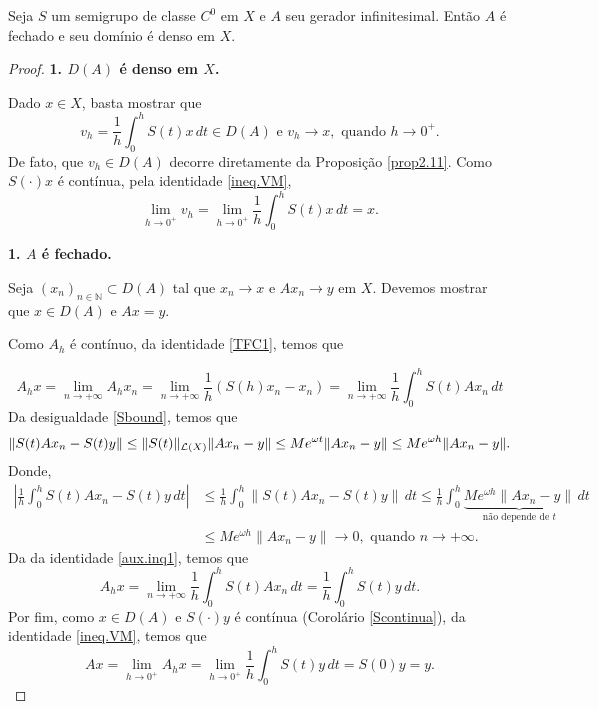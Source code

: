 \begin{proposition}
Seja $S$ um semigrupo de classe $C^0$ em $X$ e $A$ seu gerador infinitesimal. Então $A$ é fechado e seu domínio é denso em $X$.
\end{proposition}
\begin{proof}
\noindent

\noindent\textbf{1. $D(A)$ é denso em $X$.}

Dado $x\in X$, basta mostrar que 
\[v_h=\frac{1}{h}\int_0^h S(t)x\,dt\in D(A) \text{ e } v_h\to x, \text{ quando } h\to 0^+.\]
De fato, que $v_h\in D(A)$ decorre diretamente da Proposição \ref{prop2.11}. Como $S(\cdot)x$ é contínua, pela identidade \eqref{ineq.VM}, 
\[\lim\limits_{h\to 0^+} v_h=\lim\limits_{h\to 0^+}\frac{1}{h}\int_0^h S(t)x\,dt=x.\]

\noindent\textbf{1. $A$ é fechado.}

Seja $(x_n)_{n\in \mathbb{N}}\subset D(A)$ tal que $x_n\to x$ e $Ax_n\to y$ 
em  $X$. Devemos mostrar que $x\in D(A)$ e $Ax=y$.



Como $A_h$ é contínuo, da identidade \eqref{TFC1}, temos que

\begin{equation}\label{aux.inq1}
A_hx =\lim\limits_{n\to +\infty}A_hx_n
=\lim\limits_{n\to +\infty}\frac{1}{h}\left(S(h)x_n-x_n\right)  =\lim\limits_{n\to +\infty}\frac{1}{h}\int_0^h S(t)Ax_n\,dt
\end{equation}
Da desigualdade \eqref{Sbound}, temos que
\begin{equation*}
\|S(t)Ax_n-S(t)y\|\leq \|S(t)\|_{\mathcal{L}(X)}\|Ax_n-y\|\leq Me^{\omega t} \|Ax_n-y\|\leq Me^{\omega h}\|Ax_n-y\|.
\end{equation*}
Donde, 
\begin{align*}
\left|\frac{1}{h}\int_0^h S(t)Ax_n-S(t)y\,dt\right|& \leq 
\frac{1}{h}\int_0^h\|S(t)Ax_n-S(t)y\|\,dt  \leq \frac{1}{h}\int_0^h \underbrace{Me^{\omega h}\|Ax_n-y\|}_{\text{não depende de $t$}}\,dt \\
& \leq Me^{\omega h}\|Ax_n-y\|\to 0, \text{ quando } n\to +\infty. 
\end{align*}
Da da identidade \eqref{aux.inq1}, temos que
\begin{equation*}
A_hx=\lim\limits_{n\to +\infty}\frac{1}{h}\int_0^h S(t)Ax_n\,dt=
\frac{1}{h}\int_0^h S(t)y\,dt.
\end{equation*}
Por fim, como $x\in D(A)$ e $S(\cdot)y$ é contínua (Corolário \ref*{Scontinua}), da identidade \eqref{ineq.VM}, temos que
\[
Ax=\lim_{h \to 0^+} A_hx=\lim_{h \to 0^+} \frac{1}{h}\int_0^h S(t)y\,dt=S(0)y=y.
\]
\end{proof}

